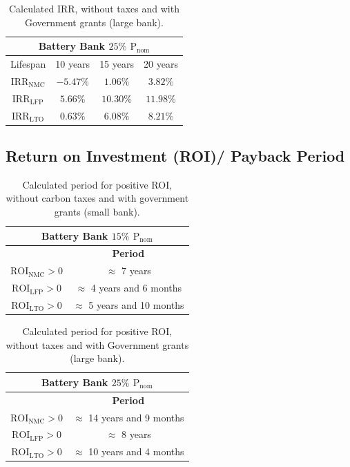 \begin{table}[H]
	\centering
	\caption{Calculated IRR, without taxes and with Government grants (large bank).}
	\label{tab:tir2s}
	\begin{tabular}{|c|c|c|c|}
		\hline
		\multicolumn{4}{|c|}{Battery Bank $25\%$ ${\text{P}}_{\text{nom}}$} \\
		\hline\hline
	Lifespan  & 10 years & 15 years & 20 years\\
		 \hline
    ${\text{IRR}}_{\text{NMC}}$ & $-5.47\%$ & $1.06\%$ & $3.82\%$ \\
		 \hline
	${\text{IRR}}_{\text{LFP}}$ & $5.66\%$ & $10.30\%$ & $11.98\%$\\
		 \hline
 	${\text{IRR}}_{\text{LTO}}$ & $0.63\%$ & $6.08\%$ & $8.21\%$\\
		 \hline
	\end{tabular}
\end{table}

\subsection{Return on Investment (ROI)/ Payback Period}

\begin{table}[H]
	\centering
	\caption{Calculated period for positive ROI, without carbon taxes and with government grants (small bank).}
	\label{tab:roi1s}
	\begin{tabular}{|c|c|}
		\hline
		\multicolumn{2}{|c|}{Battery Bank $15\%$ ${\text{P}}_{\text{nom}}$} \\
		\hline\hline
		    & \textbf{Period}\\
		 \hline
	${\text{ROI}}_{\text{NMC}}>0$ & $\approx$ 7 years\\
		 \hline
	${\text{ROI}}_{\text{LFP}}>0$ & $\approx$ 4 years and 6 months\\
		 \hline
 	${\text{ROI}}_{\text{LTO}}>0$ & $\approx$ 5 years and 10 months\\
		 \hline
	\end{tabular}
\end{table}

\begin{table}[H]
	\centering
	\caption{Calculated period for positive ROI, without taxes and with Government grants (large bank).}
	\label{tab:roi2s}
	\begin{tabular}{|c|c|}
		\hline
		\multicolumn{2}{|c|}{Battery Bank $25\%$ ${\text{P}}_{\text{nom}}$} \\
		\hline\hline
		    & \textbf{Period}\\
		 \hline
	${\text{ROI}}_{\text{NMC}}>0$ & $\approx$ 14 years and 9 months \\
		 \hline
	${\text{ROI}}_{\text{LFP}}>0$ & $\approx$ 8 years \\
		 \hline
 	${\text{ROI}}_{\text{LTO}}>0$ & $\approx$ 10 years and 4 months\\
		 \hline
	\end{tabular}
\end{table}

